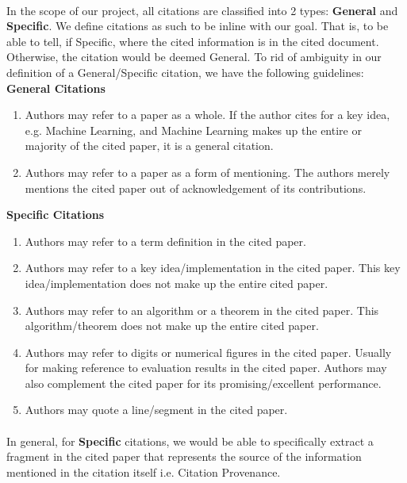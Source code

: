 \paragraph{}
In the scope of our project, all citations are classified into 2 types: \textbf{General} and \textbf{Specific}. We define citations as such to be inline with our goal. That is, to be able to tell, if Specific, where the cited information is in the cited document. Otherwise, the citation would be deemed General. To rid of ambiguity in our definition of a General/Specific citation, we have the following guidelines:\\
\textbf{General Citations}
\begin{enumerate}
\item Authors may refer to a paper as a whole. If the author cites for a key idea, e.g. Machine Learning, and Machine Learning makes up the entire or majority of the cited paper, it is a general citation.
\item Authors may refer to a paper as a form of mentioning. The authors merely mentions the cited paper out of acknowledgement of its contributions.
\end{enumerate}
\textbf{Specific Citations}
\begin{enumerate}
\item Authors may refer to a term definition in the cited paper.
\item Authors may refer to a key idea/implementation in the cited paper. This key idea/implementation does not make up the entire cited paper.
\item Authors may refer to an algorithm or a theorem in the cited paper. This algorithm/theorem does not make up the entire cited paper.
\item Authors may refer to digits or numerical figures in the cited paper. Usually for making reference to evaluation results in the cited paper. Authors may also complement the cited paper for its promising/excellent performance.
\item Authors may quote a line/segment in the cited paper.
\end{enumerate}
\paragraph{}
In general, for \textbf{Specific} citations, we would be able to specifically extract a fragment in the cited paper that represents the source of the information mentioned in the citation itself i.e. Citation Provenance.

